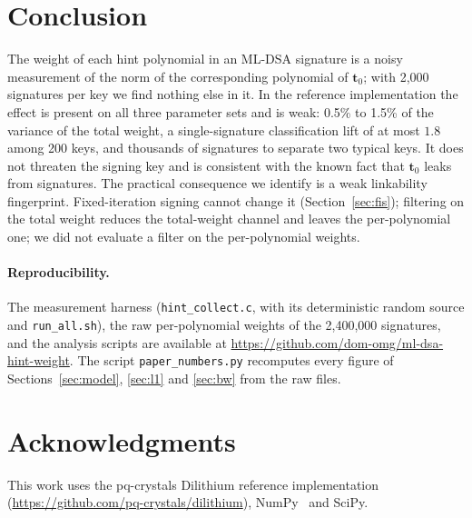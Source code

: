 \documentclass{article}
\newcommand{\tzero}{\mathbf{t}_0}
\begin{document}
\section{Conclusion}
\label{sec:conclusion}

The weight of each hint polynomial in an ML-DSA signature is a noisy
measurement of the norm of the corresponding polynomial of $\tzero$; with
2,000 signatures per key we find nothing else in it.  In the reference
implementation the effect is present on all three parameter sets and is weak: 0.5\% to 1.5\% of the variance of the
total weight, a single-signature classification lift of at most $1.8$ among
200 keys, and thousands of signatures to separate two typical keys.  It does
not threaten the signing key and is consistent with the known fact that
$\tzero$ leaks from signatures.  The practical consequence we identify is a
weak linkability fingerprint.  Fixed-iteration signing cannot change it
(Section~\ref{sec:fis}); filtering on the total weight reduces the
total-weight channel and leaves the per-polynomial one; we did not evaluate a
filter on the per-polynomial weights.

\paragraph{Reproducibility.}
The measurement harness (\texttt{hint\_collect.c}, with its deterministic
random source and \texttt{run\_all.sh}), the raw per-polynomial weights of the
2,400,000 signatures, and the analysis scripts are available at
\url{https://github.com/dom-omg/ml-dsa-hint-weight}.
The script \texttt{paper\_numbers.py} recomputes every figure of
Sections~\ref{sec:model}, \ref{sec:l1} and \ref{sec:bw} from the raw files.

\section*{Acknowledgments}

This work uses the pq-crystals Dilithium reference implementation
(\url{https://github.com/pq-crystals/dilithium}), NumPy~\cite{harris2020array}
and SciPy.
\end{document}
